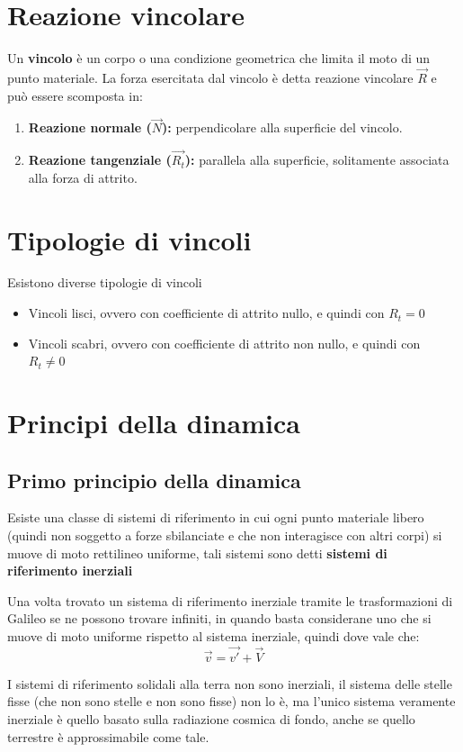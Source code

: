 \documentclass[11pt, a4paper, openright]{book}
\theoremstyle{plain}
\theoremstyle{definition}
\begin{document}
\section{Reazione vincolare}
Un \textbf{vincolo} è un corpo o una condizione geometrica che limita il moto di un punto materiale. La forza esercitata dal vincolo è detta reazione vincolare $\vec{R}$ e può essere scomposta in:
\begin{enumerate}
    \item \textbf{Reazione normale ($\vec{N}$):} perpendicolare alla superficie del vincolo.
    \item \textbf{Reazione tangenziale ($\vec{R_t}$):} parallela alla superficie, solitamente associata alla forza di attrito.
\end{enumerate}

\section{Tipologie di vincoli}
Esistono diverse tipologie di vincoli

\begin{itemize}
    \item Vincoli lisci, ovvero con coefficiente di attrito nullo, e quindi con $R_t = 0$
    \item Vincoli scabri, ovvero con coefficiente di attrito non nullo, e quindi con $R_t \not = 0$
\end{itemize}

\section{Principi della dinamica}
\subsection{Primo principio della dinamica}
Esiste una classe di sistemi di riferimento in cui ogni punto materiale libero (quindi non soggetto a forze sbilanciate e che non interagisce con altri corpi) si muove di moto rettilineo uniforme, tali sistemi sono detti \textbf{sistemi di riferimento inerziali}

Una volta trovato un sistema di riferimento inerziale tramite le trasformazioni di Galileo se ne possono trovare infiniti, in quando basta considerane uno che si muove di moto uniforme rispetto al sistema inerziale, quindi dove vale che:
\[\vec{v} = \vec{v'} + \vec{V}\]

I sistemi di riferimento solidali alla terra non sono inerziali, il sistema delle stelle fisse (che non sono stelle e non sono fisse) non lo è, ma l'unico sistema veramente inerziale è quello basato sulla radiazione cosmica di fondo, anche se quello terrestre è approssimabile come tale.
\end{document}
